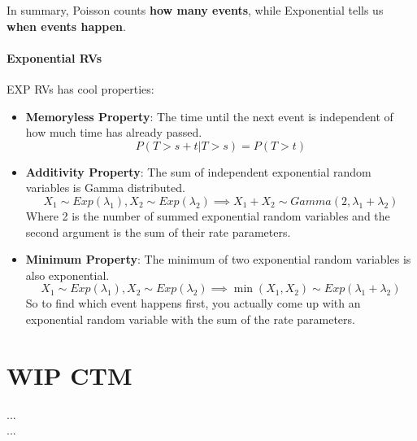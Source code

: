 \documentclass[a4paper]{article}
\begin{document}
In summary, Poisson counts \textbf{how many events}, while Exponential tells us \textbf{when events happen}.

\paragraph{Exponential RVs} EXP RVs has cool properties: \begin{itemize}
    \item \textbf{Memoryless Property}: The time until the next event is independent of how much time has already passed. $$P(T > s + t | T > s) = P(T > t)$$
    \item \textbf{Additivity Property}: The sum of independent exponential random variables is Gamma distributed. $$X_1 \sim Exp(\lambda_1), X_2 \sim Exp(\lambda_2) \implies X_1 + X_2 \sim Gamma(2, \lambda_1 + \lambda_2)$$ Where 2 is the number of summed exponential random variables and the second argument is the sum of their rate parameters.
    \item \textbf{Minimum Property}: The minimum of two exponential random variables is also exponential. $$X_1 \sim Exp(\lambda_1), X_2 \sim Exp(\lambda_2) \implies \min(X_1, X_2) \sim Exp(\lambda_1 + \lambda_2)$$ So to find which event happens first, you actually come up with an exponential random variable with the sum of the rate parameters.
\end{itemize}


\section{WIP CTM}

... \\
... \\
\end{document}
